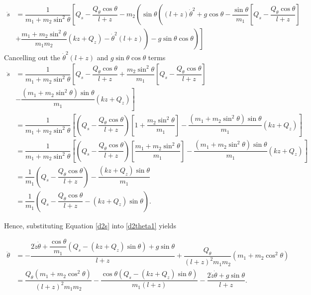 \documentclass[12pt,a4paper,portrait]{article}
\begin{document}
\begin{align*}
	\ddot{s} &= \dfrac{1}{m_1+m_2\sin^2{\theta}}\left[Q_s - \dfrac{Q_{\theta}\cos{\theta}}{l+z} - m_2\left(\sin{\theta}\left((l+z)\dot{\theta}^2+g\cos{\theta} - \dfrac{\sin{\theta}}{m_1}\left[Q_s - \dfrac{Q_{\theta}\cos{\theta}}{l+z} \right]\right.\right.\right.\\
	&\left.\left.\left.+\dfrac{m_1+m_2\sin^2{\theta}}{m_1m_2}\left(kz + Q_z\right)-\dot{\theta}^2(l+z)\right) - g\sin{\theta}\cos{\theta}\right)\right]
\end{align*}
Cancelling out the $\dot{\theta}^2(l+z)$ and $g\sin{\theta}\cos{\theta}$ terms
\begin{align}
	\ddot{s} &= \dfrac{1}{m_1+m_2\sin^2{\theta}}\left[Q_s - \dfrac{Q_{\theta}\cos{\theta}}{l+z} +  \dfrac{m_2\sin^2{\theta}}{m_1}\left[Q_s - \dfrac{Q_{\theta}\cos{\theta}}{l+z} \right]\right.\nonumber\\
	&\left.-\dfrac{(m_1+m_2\sin^2{\theta})\sin{\theta}}{m_1}\left(kz + Q_z\right)\right]\nonumber\\
	&= \dfrac{1}{m_1+m_2\sin^2{\theta}}\left[\left(Q_s - \dfrac{Q_{\theta}\cos{\theta}}{l+z}\right)\left[1+\dfrac{m_2\sin^2{\theta}}{m_1}\right]-\dfrac{(m_1+m_2\sin^2{\theta})\sin{\theta}}{m_1}\left(kz + Q_z\right)\right]\nonumber\\
	&=  \dfrac{1}{m_1+m_2\sin^2{\theta}}\left[\left(Q_s - \dfrac{Q_{\theta}\cos{\theta}}{l+z}\right)\left[\dfrac{m_1+m_2\sin^2{\theta}}{m_1}\right]-\dfrac{(m_1+m_2\sin^2{\theta})\sin{\theta}}{m_1}\left(kz + Q_z\right)\right] \nonumber\\
	&= \dfrac{1}{m_1}\left(Q_s - \dfrac{Q_{\theta}\cos{\theta}}{l+z}\right) -\dfrac{(kz+Q_z)\sin{\theta}}{m_1} \nonumber\\
	&= \dfrac{1}{m_1}\left(Q_s - \dfrac{Q_{\theta}\cos{\theta}}{l+z}-(kz+Q_z)\sin{\theta}\right). \label{d2s}
\end{align}

Hence, substituting Equation \eqref{d2s} into \eqref{d2theta1} yields

\begin{align*}
	\ddot{\theta} &= -\dfrac{2\dot{z}\dot{\theta}+\dfrac{\cos{\theta}}{m_1}\left(Q_s -(kz+Q_z)\sin{\theta}\right) + g\sin{\theta}}{l+z} + \dfrac{Q_{\theta}}{(l+z)^2m_1m_2}(m_1+m_2\cos^2{\theta})\\
	&= \dfrac{Q_{\theta}(m_1+m_2\cos^2{\theta})}{(l+z)^2m_1m_2} - \dfrac{\cos{\theta}(Q_s - (kz+Q_z)\sin{\theta})}{m_1(l+z)} - \dfrac{2\dot{z}\dot{\theta} + g\sin{\theta}}{l+z}.
\end{align*}
\end{document}

